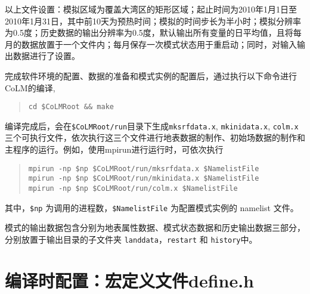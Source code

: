 \documentclass[a4paper,12pt,twoside]{article}
\begin{document}
以上文件设置：模拟区域为覆盖大湾区的矩形区域；起止时间为2010年1月1日至2010年1月31日，其中前10天为预热时间；模拟的时间步长为半小时；模拟分辨率为0.5度；历史数据的输出分辨率为0.5度，默认输出所有变量的日平均值，且将每月的数据放置于一个文件内；每月保存一次模式状态用于重启动；同时，对输入输出数据进行了设置。

完成软件环境的配置、数据的准备和模式实例的配置后，通过执行以下命令进行CoLM的编译,
\begin{quote}
\begin{lstlisting}
cd $CoLMRoot && make
\end{lstlisting}
\end{quote}
编译完成后，会在\texttt{\$CoLMRoot/run}目录下生成\texttt{mksrfdata.x}, \texttt{mkinidata.x}, \texttt{colm.x} 三个可执行文件，依次执行这三个文件进行地表数据的制作、初始场数据的制作和主程序的运行。例如，使用mpirun进行运行时，可依次执行
\begin{quote}\label{runcolm}
\begin{lstlisting}
mpirun -np $np $CoLMRoot/run/mksrfdata.x $NamelistFile
mpirun -np $np $CoLMRoot/run/mkinidata.x $NamelistFile
mpirun -np $np $CoLMRoot/run/colm.x $NamelistFile
\end{lstlisting}
\end{quote}
其中，\verb|$np| 为调用的进程数，\verb|$NamelistFile| 为配置模式实例的 namelist 文件。

模式的输出数据包含分别为地表属性数据、模式状态数据和历史输出数据三部分，分别放置于输出目录的子文件夹 \texttt{landdata}，\texttt{restart} 和 \texttt{history}中。

\section{编译时配置：宏定义文件define.h}\label{define.hux6587ux4ef6}
\end{document}

